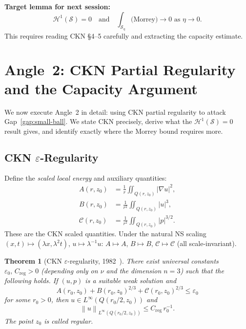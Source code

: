 \documentclass[11pt]{article}
\newtheorem{theorem}{Theorem}[section]
\theoremstyle{definition}
\theoremstyle{remark}
\newcommand{\norm}[1]{\left\|#1\right\|}
\newcommand{\grad}{\nabla}
\begin{document}
\textbf{Target lemma for next session:}
\begin{equation}\label{eq:target}
  \mathcal{H}^1(\mathcal{S}) = 0
  \quad\text{and}\quad
  \int_{\mathcal{S}_\eta}\text{(Morrey)}\to 0\text{ as }\eta\to 0.
\end{equation}
This requires reading CKN §4--5 carefully and extracting the capacity estimate.

\section{Angle~2: CKN Partial Regularity and the Capacity Argument}
\label{sec:ckn}

We now execute Angle~2 in detail: using CKN partial regularity to attack
Gap~\ref{gap:small-ball}.  We state CKN precisely, derive what the
$\mathcal{H}^1(\mathcal{S})=0$ result gives, and identify exactly where
the Morrey bound requires more.

\subsection{CKN $\varepsilon$-Regularity}

Define the \emph{scaled local energy} and auxiliary quantities:
\begin{align}
  A(r,z_0) &= \frac{1}{r}\iint_{Q(r,z_0)}|\grad u|^2,\label{eq:Ar}\\
  B(r,z_0) &= \frac{1}{r^2}\iint_{Q(r,z_0)}|u|^3,\label{eq:Br}\\
  \mathcal{C}(r,z_0) &= \frac{1}{r^2}\iint_{Q(r,z_0)}|p|^{3/2}.\label{eq:Cr}
\end{align}
These are the CKN scaled quantities.  Under the natural NS scaling
$(x,t)\mapsto(\lambda x,\lambda^2 t)$, $u\mapsto\lambda^{-1}u$:
$A\mapsto A$, $B\mapsto B$, $\mathcal{C}\mapsto\mathcal{C}$ (all scale-invariant).

\begin{theorem}[CKN $\varepsilon$-regularity, 1982~\cite{CKN1982}]\label{thm:CKN}
  There exist universal constants $\varepsilon_0,\, C_{\mathrm{reg}} > 0$
  (depending only on $\nu$ and the dimension $n=3$) such that the following
  holds.  If $(u,p)$ is a suitable weak solution and
  \begin{equation}\label{eq:CKN-small}
    A(r_0,z_0) + B(r_0,z_0)^{2/3} + \mathcal{C}(r_0,z_0)^{2/3}
    \leq \varepsilon_0
  \end{equation}
  for some $r_0>0$, then $u\in L^\infty(Q(r_0/2,z_0))$ and
  \begin{equation}\label{eq:CKN-bound}
    \norm{u}_{L^\infty(Q(r_0/2,z_0))} \leq C_{\mathrm{reg}}\, r_0^{-1}.
  \end{equation}
  The point $z_0$ is called \emph{regular}.
\end{theorem}
\end{document}
